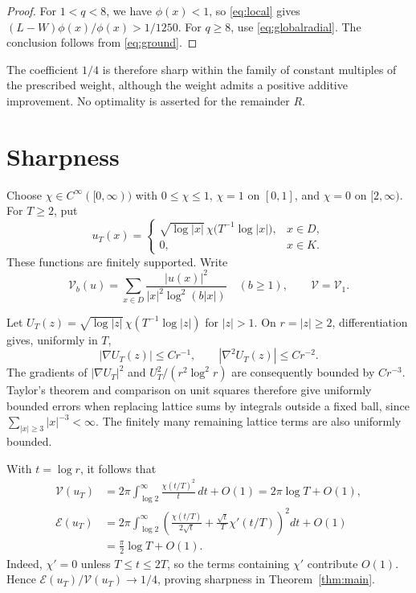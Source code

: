 \documentclass[11pt]{amsart}
\numberwithin{equation}{section}
\newcommand{\E}{\mathcal E}
\newcommand{\V}{\mathcal V}
\begin{document}
\begin{proof}
For $1<q<8$, we have $\phi(x)<1$, so \eqref{eq:local} gives
$(L-W)\phi(x)/\phi(x)>1/1250$. For $q\ge8$, use
\eqref{eq:globalradial}. The conclusion follows from \eqref{eq:ground}.
\end{proof}

The coefficient $1/4$ is therefore sharp within the family of constant
multiples of the prescribed weight, although the weight admits a positive
additive improvement. No optimality is asserted for the remainder $R$.

\section{Sharpness}\label{sec:sharpness}

Choose $\chi\in C^\infty([0,\infty))$ with $0\le\chi\le1$,
$\chi=1$ on $[0,1]$, and $\chi=0$ on $[2,\infty)$.
For $T\ge2$, put
\[
u_T(x)=
\begin{cases}
\sqrt{\log|x|}\,\chi\bigl(T^{-1}\log|x|\bigr),&x\in D,\\
0,&x\in K.
\end{cases}
\]
These functions are finitely supported. Write
\[
\V_b(u)=\sum_{x\in D}
\frac{|u(x)|^2}{|x|^2\log^2(b|x|)}
\quad(b\ge1),\qquad \V=\V_1.
\]

Let $U_T(z)=\sqrt{\log|z|}\,\chi(T^{-1}\log|z|)$ for $|z|>1$.
On $r=|z|\ge2$, differentiation gives, uniformly in $T$,
\[
|\nabla U_T(z)|\le Cr^{-1},\qquad
|\nabla^2U_T(z)|\le Cr^{-2}.
\]
The gradients of $|\nabla U_T|^2$ and $U_T^2/(r^2\log^2r)$
are consequently bounded by $Cr^{-3}$.
Taylor's theorem and comparison on unit squares therefore give
uniformly bounded errors when replacing lattice sums by integrals
outside a fixed ball, since $\sum_{|x|\ge3}|x|^{-3}<\infty$.
The finitely many remaining lattice terms are also uniformly bounded.

With $t=\log r$, it follows that
\begin{align*}
\V(u_T)
&=2\pi\int_{\log2}^{\infty}
\frac{\chi(t/T)^2}{t}\,dt+O(1)
=2\pi\log T+O(1),\\
\E(u_T)
&=2\pi\int_{\log2}^{\infty}
\left(
\frac{\chi(t/T)}{2\sqrt t}
+\frac{\sqrt t}{T}\chi'(t/T)
\right)^2dt+O(1)\\
&=\frac\pi2\log T+O(1).
\end{align*}
Indeed, $\chi'=0$ unless $T\le t\le2T$, so the terms containing
$\chi'$ contribute $O(1)$. Hence
$\E(u_T)/\V(u_T)\to1/4$, proving sharpness in
Theorem~\ref{thm:main}.
\end{document}
